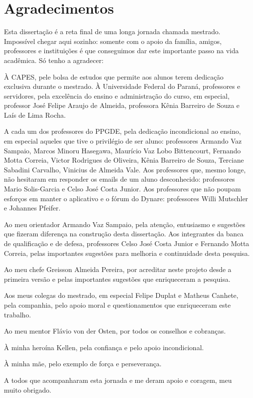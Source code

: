 \documentclass[../thesis.tex]{subfiles}
\begin{document}
	
	\newpage
	
	\section*{Agradecimentos} %

	Esta dissertação é a reta final de uma longa jornada chamada mestrado. Impossível chegar aqui sozinho: somente com o apoio da família, amigos, professores e instituições é que conseguimos dar este importante passo na vida acadêmica. Só tenho a agradecer:
	
	À CAPES, pele bolsa de estudos que permite aos alunos terem dedicação exclusiva durante o mestrado. À Universidade Federal do Paraná, professores e servidores, pela excelência do ensino e administração do curso, em especial, professor José Felipe Araujo de Almeida, professora Kênia Barreiro de Souza e Laís de Lima Rocha.

	A cada um dos professores do PPGDE, pela dedicação incondicional ao ensino, em especial aqueles que tive o privilégio de ser aluno: professores Armando Vaz Sampaio, Marcos Minoru Hasegawa, Maurício Vaz Lobo Bittencourt, Fernando Motta Correia, Victor Rodrigues de Oliveira, Kênia Barreiro de Souza, Terciane Sabadini Carvalho, Vinicius de Almeida Vale. Aos professores que, mesmo longe, não hesitaram em responder os emails de um aluno desconhecido: professores Mario Solis-Garcia e Celso José Costa Junior. Aos professores que não poupam esforços em manter o aplicativo e o fórum do Dynare: professores Willi Mutschler e Johannes Pfeifer.
	
	Ao meu orientador Armando Vaz Sampaio, pela atenção, entusiasmo e sugestões que fizeram diferença na construção desta dissertação. Aos integrantes da banca de qualificação e de defesa, professores Celso José Costa Junior e Fernando Motta Correia, pelas importantes sugestões para melhoria e continuidade desta pesquisa.

	Ao meu chefe Greisson Almeida Pereira, por acreditar neste projeto desde a primeira versão e pelas importantes sugestões que enriqueceram a pesquisa.
	
	Aos meus colegas do mestrado, em especial Felipe Duplat e Matheus Canhete, pela companhia, pelo apoio moral e questionamentos que enriqueceram este trabalho.
	
	Ao meu mentor Flávio von der Osten, por todos os conselhos e cobranças.
	
	À minha heroína Kellen, pela confiança e pelo apoio incondicional.
	
	À minha mãe, pelo exemplo de força e perseverança.
	
	A todos que acompanharam esta jornada e me deram apoio e coragem, meu muito obrigado.
	
	\thispagestyle{empty}
\end{document}
